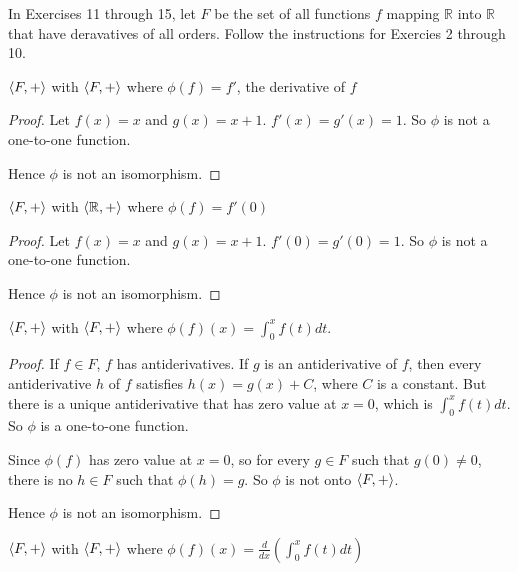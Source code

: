 In Exercises 11 through 15, let $F$ be the set of all functions $f$ mapping $\mathbb{R}$ into $\mathbb{R}$ that have deravatives of all orders. Follow the instructions for Exercies 2 through 10.

\begin{exercise}
    $\left\langle{F,+}\right\rangle$ with $\left\langle{F,+}\right\rangle$ where $\phi(f) = f'$, the derivative of $f$
\end{exercise}

\begin{proof}
    Let $f(x) = x$ and $g(x) = x + 1$. $f'(x) = g'(x) = 1$. So $\phi$ is not a one-to-one function.

    Hence $\phi$ is not an isomorphism.
\end{proof}

\begin{exercise}
    $\left\langle{F, +}\right\rangle$ with $\left\langle{\mathbb{R}, +}\right\rangle$ where $\phi(f) = f'(0)$
\end{exercise}

\begin{proof}
    Let $f(x) = x$ and $g(x) = x + 1$. $f'(0) = g'(0) = 1$. So $\phi$ is not a one-to-one function.

    Hence $\phi$ is not an isomorphism.
\end{proof}

\begin{exercise}
    $\left\langle{F,+}\right\rangle$ with $\left\langle{F,+}\right\rangle$ where $\phi(f)(x) = \int^{x}_{0}f(t)dt$.
\end{exercise}

\begin{proof}
    If $f\in F$, $f$ has antiderivatives. If $g$ is an antiderivative of $f$, then every antiderivative $h$ of $f$ satisfies $h(x) = g(x) + C$, where $C$ is a constant. But there is a unique antiderivative that has zero value at $x = 0$, which is $\int^{x}_{0}f(t)dt$. So $\phi$ is a one-to-one function.

    Since $\phi(f)$ has zero value at $x = 0$, so for every $g\in F$ such that $g(0)\ne 0$, there is no $h\in F$ such that $\phi(h) = g$. So $\phi$ is not onto $\left\langle{F,+}\right\rangle$.

    Hence $\phi$ is not an isomorphism.
\end{proof}

\begin{exercise}
    $\left\langle{F,+}\right\rangle$ with $\left\langle{F,+}\right\rangle$ where $\phi(f)(x) = \frac{d}{dx}\left(\int^{x}_{0} f(t)dt\right)$
\end{exercise}


